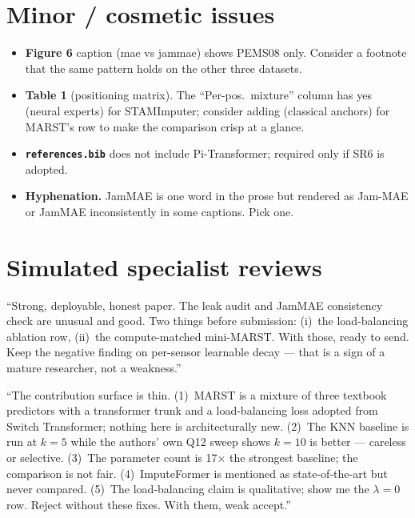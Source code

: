 \documentclass[11pt]{article}
\begin{document}
\section{Minor / cosmetic issues}

\begin{itemize}
\item \textbf{Figure 6} caption (\textsf{mae vs jammae}) shows PEMS08
only.  Consider a footnote that the same pattern holds on the other
three datasets.
\item \textbf{Table 1} (positioning matrix).  The ``Per-pos.\ mixture''
column has \textsf{yes (neural experts)} for STAMImputer; consider
adding \textsf{(classical anchors)} for MARST's row to make the
comparison crisp at a glance.
\item \textbf{\texttt{references.bib}} does not include Pi-Transformer;
required only if SR6 is adopted.
\item \textbf{Hyphenation.}  \textsf{JamMAE} is one word in the prose
but rendered as \textsf{Jam-MAE} or \textsf{JamMAE} inconsistently in
some captions.  Pick one.
\end{itemize}

\section{Simulated specialist reviews}

\begin{tcolorbox}[reviewerbox, title=Friendly reviewer (PhD supervisor tone)]
``Strong, deployable, honest paper.  The leak audit and JamMAE
consistency check are unusual and good.  Two things before submission:
(i)~the load-balancing ablation row, (ii)~the compute-matched
mini-MARST.  With those, ready to send.  Keep the negative finding on
per-sensor learnable decay --- that is a sign of a mature researcher,
not a weakness.''
\end{tcolorbox}

\begin{tcolorbox}[reviewerbox, title=Harsh reviewer (top conference tone)]
``The contribution surface is thin.  (1)~MARST is a mixture of three
textbook predictors with a transformer trunk and a load-balancing loss
adopted from Switch Transformer; nothing here is architecturally new.
(2)~The KNN baseline is run at $k = 5$ while the authors' own Q12
sweep shows $k = 10$ is better --- careless or selective.  (3)~The
parameter count is 17$\times$ the strongest baseline; the comparison
is not fair.  (4)~ImputeFormer is mentioned as state-of-the-art but
never compared.  (5)~The load-balancing claim is qualitative; show me
the $\lambda = 0$ row.  Reject without these fixes.  With them, weak
accept.''
\end{tcolorbox}
\end{document}
